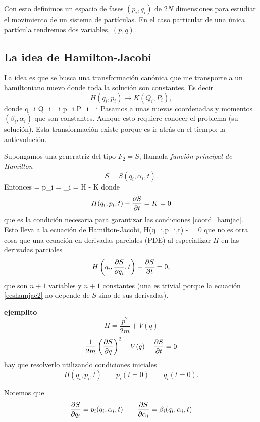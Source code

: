 \documentclass[10pt,oneside]{CBFT_book}
\begin{document}
Con esto definimos un espacio de fases $(p_i,q_i)$ de $2N$ dimensiones para estudiar el movimiento de un sistema de partículas.
En el caso particular de una única partícula tendremos dos variables, $(p,q)$.

\subsection{La idea de Hamilton-Jacobi}

La idea es que se busca una transformación canónica que me transporte a un hamiltoniano nuevo donde toda la solución son 
constantes. Es decir 
\[
	H(q_i,p_i) \longrightarrow K(Q_i,P_i),
\]
donde
\be
	q_i \longrightarrow Q_i \equiv \beta_i \qquad p_i \longrightarrow P_i \equiv \alpha_i
	\label{coord_hamjac}
\ee
Pasamos a unas nuevas coordenadas y momentos $(\beta_i,\alpha_i)$ que son constantes. 
Aunque esto requiere conocer el problema (su solución). Esta transformación existe porque es ir atrás en el tiempo;
la antievolución.

Supongamos una generatriz del tipo $F_2 = S$, llamada {\it función principal de Hamilton}
\[
	S = S(q_i, \alpha_i, t).
\]
Entonces
\be
	 = p_i \qquad {} = \beta_i \qquad {} = H - K  
	\label{ecshamjac}
\ee
donde 
\[
	H(q_i,p_i,t) - \frac{\partial^{\hspace{-0.05em}} {S}}{\partial {t}^{\hspace{-0.05em}}} = K = 0
\]
que es la condición necesaria para garantizar las condiciones \eqref{coord_hamjac}.
Esto lleva a la ecuación de Hamilton-Jacobi,
\be
	H(q_i,p_i,t) -  = 0
	\label{ecshamjac2}
\ee
que no es otra cosa que una ecuación en derivadas parciales (PDE) al especializar $H$ en las derivadas parciales
\[
	H \left( q_i, \frac{\partial^{\hspace{-0.05em}} {S}}{\partial {q_i}^{\hspace{-0.05em}}}, t \right) - \frac{\partial^{\hspace{-0.05em}} {S}}{\partial {t}^{\hspace{-0.05em}}} = 0,
\]
que son $n+1$ variables y $n+1$ constantes (una es trivial porque la ecuación \eqref{ecshamjac2} no depende de $S$ sino de sus 
derivadas).

\begin{ejemplo}{\bf ejemplito}
\[
	H = \frac{p^2}{2m} + V(q)
\]
\[
	\frac{1}{2m} \left( \frac{\partial^{\hspace{-0.05em}} {S}}{\partial {q}^{\hspace{-0.05em}}} \right)^2 + V(q) + \frac{\partial^{\hspace{-0.05em}} {S}}{\partial {t}^{\hspace{-0.05em}}} = 0
\]
hay que resolverlo utilizando condiciones iniciales
\[
	H(q_i,p_i,t) \qquad p_i(t=0) \qquad q_i(t=0).
\]
\end{ejemplo}

Notemos que 
\[
	\frac{\partial^{\hspace{-0.05em}} {S}}{\partial {q_i}^{\hspace{-0.05em}}} = p_i(q_i,\alpha_i,t) \qquad \frac{\partial^{\hspace{-0.05em}} {S}}{\partial {\alpha_i}^{\hspace{-0.05em}}} = \beta_i(q_i,\alpha_i,t)
\]
\end{document}
